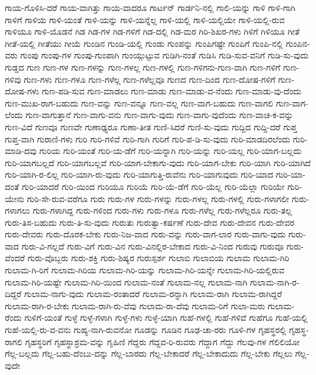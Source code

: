 {ಗಾಯ-ಗೊಳಿಸಿ-ದರೆ
ಗಾಯ-ವಾಗಿತ್ತು
ಗಾಯ-ವಾದರೂ
ಗಾರ್ಟನ್
ಗಾರ್ಡನಿ-ನಲ್ಲಿ
ಗಾಲಿ-ಯನ್ನು
ಗಾಳಿ
ಗಾಳಿ-ಗಾಗಿ
ಗಾಳಿಗೆ
ಗಾಳಿಯ
ಗಾಳಿ-ಯಂತೆ
ಗಾಳಿ-ಯನ್ನು
ಗಾಳಿ-ಯನ್ನೆಲ್ಲ
ಗಾಳಿ-ಯಲ್ಲಿ
ಗಾಳಿ-ಯಲ್ಲಿಯೇ
ಗಾಳಿ-ಯಲ್ಲಿ-ರುವ
ಗಾಳಿಯೂ
ಗಾಳಿ-ಯೊಡನೆ
ಗಿಡ
ಗಿಡ-ಗಳ
ಗಿಡ-ಗಳಿಗೆ
ಗಿಡ-ದಲ್ಲಿ
ಗಿಡ-ಮರ
ಗಿರಿ-ಶಿಖರ-ಗಳು
ಗಿಳಿಗೆ
ಗಿಳಿಯೂ
ಗೀತೆ
ಗೀತೆ-ಯಲ್ಲಿ
ಗೀತೆಯು
ಗೀಯೆ
ಗುಂಡಿನ
ಗುಂಡಿ-ಯಲ್ಲಿ
ಗುಂಡು
ಗುಂಪನ್ನು
ಗುಂಪಿಗಷ್ಟೇ
ಗುಂಪಿಗೆ
ಗುಂಪಿ-ನಲ್ಲಿ
ಗುಂಪಿನ-ವರು
ಗುಂಪು
ಗುಂಪು-ಗಳ
ಗುಂಪು-ಗುಂಪಾಗಿ
ಗುಂಯ್ಗುಟ್ಟುವ
ಗುಡಿಗಿ-ನಂತೆ
ಗುಡಿಸಿ
ಗುಡಿ-ಸುವ-ವನಿಗೆ
ಗುಡಿ-ಸು-ವುದು
ಗುಡ್ಡದ
ಗುಣ
ಗುಣ-ಗಳ
ಗುಣ-ಗಳನ್ನು
ಗುಣ-ಗಳಲ್ಲ
ಗುಣ-ಗಳಲ್ಲಿ
ಗುಣ-ಗಳಿಗನು-ಗುಣ-ವಾಗಿ
ಗುಣ-ಗಳಿಗೆ
ಗುಣ-ಗಳಿವು
ಗುಣ-ಗಳು
ಗುಣ-ಗಳೂ
ಗುಣ-ಗಳೆಲ್ಲ
ಗುಣ-ಗಳೆಲ್ಲವೂ
ಗುಣದ
ಗುಣ-ದಿಂದ
ಗುಣ-ದೋಷ-ಗಳಿಗೆ
ಗುಣ-ದೋಷ-ಗಳು
ಗುಣ-ಪಡಿ-ಸುವ
ಗುಣ-ಮಾಡಲು
ಗುಣ-ಮಾಡು
ಗುಣ-ಮಾಡು-ವ-ನೆಂದು
ಗುಣ-ಮಾಡು-ವು-ದೆಂದು
ಗುಣ-ಮುಖ-ರಾಗ-ಬಹುದು
ಗುಣ-ವನ್ನು
ಗುಣ-ವನ್ನೂ
ಗುಣ-ವಲ್ಲ
ಗುಣ-ವಾಗ-ಬಹುದು
ಗುಣ-ವಾಗಲಿ
ಗುಣ-ವಾಗ-ಲೆಂದು
ಗುಣ-ವಾಗುತ್ತಾನೆ
ಗುಣ-ವಾಗು-ವನು
ಗುಣ-ವಾಗು-ವುದು
ಗುಣ-ವಾಗು-ವುದೆಂದು
ಗುಣ-ವಾಚ-ಕ-ವನ್ನು
ಗುಣ-ವಿದೆ
ಗುಣವೂ
ಗುಣವೇ
ಗುಣಾಢ್ಯರೂ
ಗುಣಾ-ತೀತ
ಗುಣಿ-ಸಿದರೆ
ಗುಣಿ-ಸು-ವುದು
ಗುದ್ದಿದ
ಗುದ್ದಿ-ದರೆ
ಗುಪ್ತ
ಗುಪ್ತ-ವಾಗಿ
ಗುರಾಣಿ-ಗಳು
ಗುರಿ
ಗುರಿ-ಗಳಿವೆ
ಗುರಿ-ಗಾಗಿ
ಗುರಿಗೆ
ಗುರಿ-ಪ-ಡಿ-ಸು-ವುದು
ಗುರಿ-ಮಾಡದಿರಲೆಂದು
ಗುರಿ-ಮಾಡಿ-ದವು
ಗುರಿಯ
ಗುರಿ-ಯಂತೆ
ಗುರಿ-ಯ-ಡೆಗೆ
ಗುರಿ-ಯನ್ನಾಗಿ
ಗುರಿ-ಯನ್ನು
ಗುರಿ-ಯಲ್ಲ
ಗುರಿ-ಯಾಗ-ಬಲ್ಲದು
ಗುರಿ-ಯಾಗಬಲ್ಲದೆ
ಗುರಿ-ಯಾಗಬಲ್ಲವೆ
ಗುರಿ-ಯಾಗ-ಬೇಕಾಗು-ವುದು
ಗುರಿ-ಯಾಗ-ಬೇಕು
ಗುರಿ-ಯಾಗಿ
ಗುರಿ-ಯಾಗಿದೆ
ಗುರಿ-ಯಾಗಿ-ರ-ಲಿಲ್ಲ
ಗುರಿ-ಯಾಗಿ-ರು-ವುದು
ಗುರಿ-ಯಾಗುತ್ತಿ-ರುವೆನು
ಗುರಿ-ಯಾಗುವುದು
ಗುರಿ-ಯಾದ
ಗುರಿ-ಯಾ-ದಂತೆ
ಗುರಿ-ಯಾದರೆ
ಗುರಿ-ಯಿಂದ
ಗುರಿಯೂ
ಗುರಿಯೆ
ಗುರಿ-ಯೆ-ಡೆಗೆ
ಗುರಿ-ಯೆಲ್ಲ
ಗುರಿ-ಯೆಲ್ಲಾ
ಗುರಿಯೇ
ಗುರಿ-ಯೇನು
ಗುರಿ-ಸೇ-ರುವ-ವರೆಗೂ
ಗುರು
ಗುರು-ಗಳ
ಗುರು-ಗಳನ್ನು
ಗುರು-ಗಳಲ್ಲ
ಗುರು-ಗಳಲ್ಲಿ
ಗುರು-ಗಳಾಗಲೀ
ಗುರು-ಗಳಾಗಲು
ಗುರು-ಗಳಾಗಿದ್ದ
ಗುರು-ಗಳಿಂದ
ಗುರು-ಗಳು
ಗುರು-ಗಳೂ
ಗುರು-ಗಳೆಲ್ಲ
ಗುರು-ಗಳೆಲ್ಲರೂ
ಗುರು-ತಲ್ಲ
ಗುರು-ತಿಸ-ಬಹುದು
ಗುರು-ತಿ-ಸು-ವುದು
ಗುರುತು
ಗುರುತ್ವಾ-ಕರ್ಷಣೆ
ಗುರು-ದೇವ
ಗುರು-ದೇವನ
ಗುರು-ದೇವರ
ಗುರು-ದೇವರು
ಗುರು-ದೊರಕ-ಬೇಕು
ಗುರು-ನಿಜ-ವಾದ
ಗುರು-ವನ್ನು
ಗುರು-ವಾಗ-ಲಾರ
ಗುರು-ವಾಗು-ವುದು
ಗುರು-ವಾದ
ಗುರು-ವಿ-ಗಲ್ಲದೆ
ಗುರು-ವಿಗೆ
ಗುರು-ವಿನ
ಗುರು-ವಿನಲ್ಲಿರ-ಬೇಕಾದ
ಗುರು-ವಿ-ನಿಂದ
ಗುರುವು
ಗುರುವೂ
ಗುರು-ವೆಂದರೆ
ಗುರು-ವೊಬ್ಬರು
ಗುರು-ಶಕ್ತಿ
ಗುರು-ಶಿಷ್ಯರ
ಗುರುಸ್ಪರ್ಶ
ಗುಲಾಬಿ
ಗುಲಾಬಿಯ
ಗುಲಾಮ
ಗುಲಾಮ-ಗಿರಿ
ಗುಲಾಮ-ಗಿ-ರಿಗೆ
ಗುಲಾಮ-ಗಿರಿಯ
ಗುಲಾಮ-ಗಿರಿ-ಯನ್ನು
ಗುಲಾಮ-ಗಿರಿ-ಯನ್ನೇ
ಗುಲಾಮ-ಗಿರಿ-ಯಲ್ಲಿರುವ
ಗುಲಾಮ-ಗಿರಿ-ಯಷ್ಟೇ
ಗುಲಾಮ-ಗಿರಿ-ಯಿಂದ
ಗುಲಾಮ-ನಂತೆ
ಗುಲಾಮ-ನಲ್ಲ
ಗುಲಾಮ-ನಾಗಿ
ಗುಲಾಮ-ನಾಗಿ-ರ-ದಿದ್ದರೆ
ಗುಲಾಮ-ನಾಗು-ವುದು
ಗುಲಾಮ-ರಂತಾದರೆ
ಗುಲಾಮ-ರನ್ನಾಗಿ
ಗುಲಾಮ-ರಾಗಿ
ಗುಲಾಮ-ರಾಗಿದ್ದರೆ
ಗುಲಾಮ-ರಾಗಿ-ರ-ಬೇಕು
ಗುಲಾಮ-ರಾಗಿ-ರು-ವೆವು
ಗುಲಾಮ-ರಾ-ದೆವು
ಗುಲಾಮ-ರಿಗೆ
ಗುಲಾ-ಮರು
ಗುಲಾಮ-ರೆಂದು
ಗುಳಿಗೆ-ಯಂತೆ
ಗುಳ್ಳೆ
ಗುಳ್ಳೆ-ಗಳಾಗಿ
ಗುಳ್ಳೆ-ಗಳು
ಗುಳ್ಳೆ-ಯಾಗಿ
ಗುಹೆ-ಗಳಲ್ಲಿ
ಗುಹೆ-ಗಳಿವೆ
ಗುಹೆಗೂ
ಗುಹೆ-ಯಲ್ಲಿ
ಗುಹೆ-ಯಲ್ಲಿ-ರು-ವ-ವನು
ಗುಹ್ಯ-ನಾಗಿ-ರುವನೋ
ಗೂಡನ್ನು
ಗೂಡಿನ
ಗೂಢ-ಚಾ-ರರು
ಗೂಳಿ-ಗಳ
ಗೃಹಸ್ಥರಲ್ಲಿ
ಗೃಹಸ್ಥ-ರಾಗಲಿ
ಗೃಹಸ್ಥರಿಗೆ
ಗೃಹಸ್ಥಾಶ್ರಮ-ವನ್ನು
ಗೃಹಿಣಿ
ಗೆದ್ದರು
ಗೆದ್ದವ-ರಿ-ರುವರು
ಗೆದ್ದಾಗ
ಗೆದ್ದು
ಗೆಲವು-ಗಳ
ಗೆಲಿಲಿಯೋ
ಗೆಲ್ಲ-ಬಲ್ಲದು
ಗೆಲ್ಲ-ಬಹು-ದೆಂಬು-ದನ್ನು
ಗೆಲ್ಲ-ಬಾರದು
ಗೆಲ್ಲ-ಬೇಕಾದರೆ
ಗೆಲ್ಲ-ಬೇಕಾದುದು
ಗೆಲ್ಲ-ಬೇಕು
ಗೆಲ್ಲಲು
ಗೆಲ್ಲ-ವುದೇ
}
